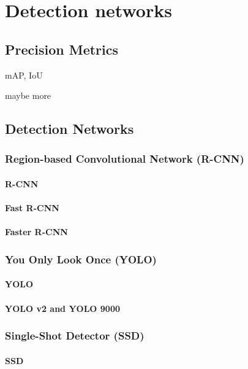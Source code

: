 \chapter{Detection networks}
\label{chapt:models}
\section{Precision Metrics}
mAP, IoU




maybe more

\section{Detection Networks}

\subsection{Region-based Convolutional Network (R-CNN)}
\subsubsection{R-CNN}
\subsubsection{Fast R-CNN}
\subsubsection{Faster R-CNN}

\subsection{You Only Look Once (YOLO)}
\subsubsection{YOLO}
\label{sec:yolo}
\subsubsection{YOLO v2 and YOLO 9000}

\subsection{Single-Shot Detector (SSD)}
\label{sec:ssd}
\subsubsection{SSD}

